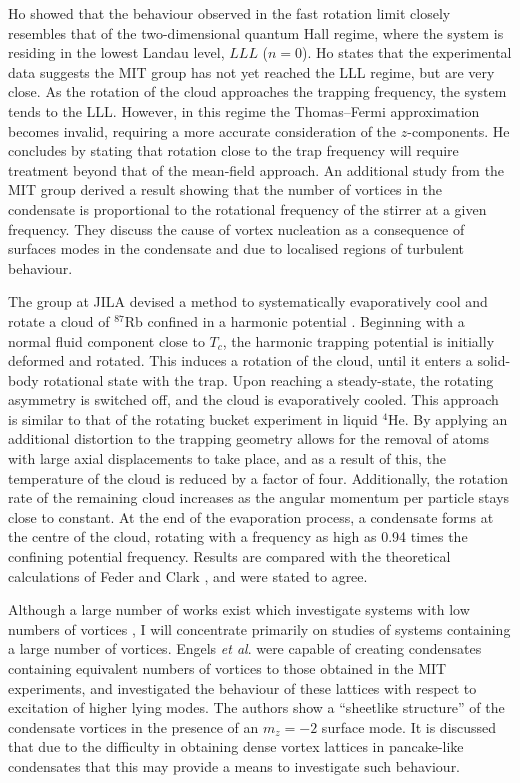 Ho \cite{Vtx:Ho_prl_2001} showed that the behaviour observed in the fast rotation limit closely resembles that of the two-dimensional quantum Hall regime, where the system is residing in the lowest Landau level, $LLL$ ($n=0$). Ho states that the experimental data suggests the MIT group has not yet reached the LLL regime, but are very close. As the rotation of the cloud approaches the trapping frequency, the system tends to the LLL. However, in this regime the Thomas--Fermi approximation becomes invalid, requiring a more accurate consideration of the $z$-components. He concludes by stating that rotation close to the trap frequency will require treatment beyond that of the mean-field approach. An additional study from the MIT group \cite{Vtx:Raman_prl_2001} derived a result showing that the number of vortices in the condensate is proportional to the rotational frequency of the stirrer at a given frequency. They discuss the cause of vortex nucleation as a consequence of surfaces modes in the condensate and due to localised regions of turbulent behaviour.

The group at JILA devised a method to systematically evaporatively cool and rotate a cloud of $^{87}$Rb confined in a harmonic potential \cite{Vtx:Haljan_prl_2001}. Beginning with a normal fluid component close to $T_c$, the harmonic trapping potential is initially deformed and rotated. This induces a rotation of the cloud, until it enters a solid-body rotational state with the trap. Upon
reaching a steady-state, the rotating asymmetry is switched off, and the cloud is evaporatively cooled. This approach is similar to that of the rotating bucket experiment in liquid $^4$He. By applying an additional distortion to the trapping geometry allows for the removal of atoms with large axial displacements to take place, and as a result of this, the temperature of the cloud is reduced by a factor of four. Additionally, the rotation rate of the remaining cloud increases as the angular momentum per particle stays close to constant. At the end of the evaporation process, a condensate forms at the centre of the cloud, rotating with a frequency as high as 0.94 times the confining potential frequency. Results are compared with the theoretical calculations of Feder and Clark \cite{Vtx:Feder_prl_2001}, and were stated to agree.

Although a large number of works exist which investigate systems with low numbers of vortices \cite{THS:Davies_2000,Vtx:Chevy_prl_2000,Vtx:Cooper_prl_2001,Vtx:Rosenbusch_prl_2002,Vtx:Ogawa_pra_2002,Vtx:Bretin_joptb_2003}, I will concentrate primarily on studies of systems containing a large number of vortices. Engels \textit{et al}. \cite{Vtx:Engels_prl_2002} were capable of creating condensates containing equivalent numbers of vortices to those obtained in the MIT experiments, and investigated the behaviour of these lattices with respect to excitation of higher lying modes. The authors show a ``sheetlike structure'' of the condensate vortices in the presence of an $m_z=-2$ surface mode. It is discussed that due to the difficulty in obtaining dense vortex lattices in pancake-like condensates that this may provide a means to investigate such behaviour.

